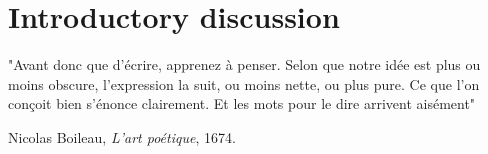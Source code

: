 

\section{Introductory discussion}

"Avant donc que d'écrire, apprenez à penser.
Selon que notre idée est plus ou moins obscure, l'expression la suit, ou moins nette, ou plus pure.
Ce que l'on conçoit bien s'énonce clairement. Et les mots pour le dire arrivent aisément"

\begin{flushright}
Nicolas Boileau, \textit{L'art poétique}, 1674.
\end{flushright}


